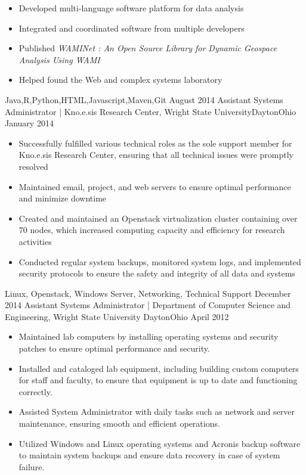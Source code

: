 \begin{experiences}
{\begin{itemize}
        \item Developed multi-language software platform for data analysis
        \item Integrated and coordinated software from multiple developers
        \item Published \textit{WAMINet : An Open Source Library for Dynamic Geospace Analysis Using WAMI}
        \item Helped found the Web and complex systems laboratory
      \end{itemize}
    }
    {Java,R,Python,HTML,Javascript,Maven,Git}
  \emptySeparator
  \experience
  {August 2014} {Assistant Systems Administrator | Kno.e.sis Research Center, Wright State University}{Dayton}{Ohio}
  {January 2014} {
      \begin{itemize}
          \item Successfully fulfilled various technical roles as the sole support member for Kno.e.sis Research Center, ensuring that all technical issues were promptly resolved
          \item Maintained email, project, and web servers to ensure optimal performance and minimize downtime
          \item Created and maintained an Openstack virtualization cluster containing over 70 nodes, which increased computing capacity and efficiency for research activities
          \item Conducted regular system backups, monitored system logs, and implemented security protocols to ensure the safety and integrity of all data and systems
      \end{itemize}
  }
  {Linux, Openstack, Windows Server, Networking, Technical Support}
  \emptySeparator
  \experience
  {December 2014}     { Assistant Systems Administrator | Department of Computer Science and Engineering, Wright State University }{Dayton}{Ohio}
  {April 2012}    {
      \begin{itemize}
          \item Maintained lab computers by installing operating systems and security patches to ensure optimal performance and security.
          \item Installed and cataloged lab equipment, including building custom computers for staff and faculty, to ensure that equipment is up to date and functioning correctly.
          \item Assisted System Administrator with daily tasks such as network and server maintenance, ensuring smooth and efficient operations.
          \item Utilized Windows and Linux operating systems and Acronis backup software to maintain system backups and ensure data recovery in case of system failure.

\end{itemize}}
\end{experiences}
